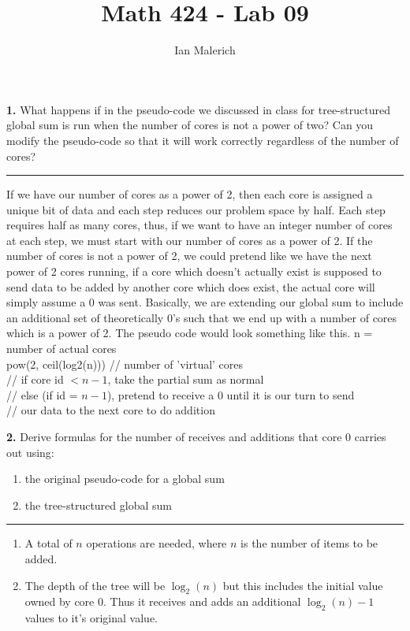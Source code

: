\documentclass[12pt]{jhwhw}
\author{Ian Malerich}
\title{Math 424 - Lab 09}
\begin{document}
\raggedright

\textbf{1.}
	What happens if in the pseudo-code we discussed in class for tree-structured global
	sum is run when the number of cores is not a power of two? Can you modify the pseudo-code
	so that it will work correctly regardless of the number of cores?
\textcolor[RGB]{240,240,240}{\rule{\textwidth}{0.5pt}}\bigbreak

	\begin{addmargin}[1em]{}
		If we have our number of cores as a power of 2, then each core is assigned
		a unique bit of data and each step reduces our problem space by half.
		Each step requires half as many cores, thus, if we want to have an integer number
		of cores at each step, we must start with our number of cores as a power of 2.
		\bigbreak
		If the number of cores is not a power of 2, we could pretend like we have
		the next power of 2 cores running, if a core which doesn't actually exist 
		is supposed to send data to be added by another core which does exist,
		the actual core will simply assume a 0 was sent. Basically, we are extending
		our global sum to include an additional set of theoretically 0's such that
		we end up with a number of cores which is a power of 2.
		The pseudo code would look something like this.
		\bigbreak
		n = number of actual cores \\
		pow(2, ceil(log2(n))) // number of 'virtual' cores \\

		// if core id $< n-1$, take the partial sum as normal \\
		// else (if id = $n-1$), pretend to receive a 0 until it is our turn to send   \\
		// our data to the next core to do addition \\
	\end{addmargin}

\bigbreak
\textbf{2.}
	Derive formulas for the number of receives and additions that core 0 carries out using:
	\begin{enumerate}
		\item the original pseudo-code for a global sum
		\item the tree-structured global sum
	\end{enumerate}
\textcolor[RGB]{240,240,240}{\rule{\textwidth}{0.5pt}}\bigbreak

	\begin{addmargin}[1em]{}
		\begin{enumerate}
			\item A total of $n$ operations are needed, where $n$ is the number of
				items to be added.
			\item The depth of the tree will be $\log_2(n)$ but this includes
				the initial value owned by core 0. Thus it receives and adds an additional
				$\log_2(n)-1$ values to it's original value.
		\end{enumerate}
	\end{addmargin}
\end{document}
